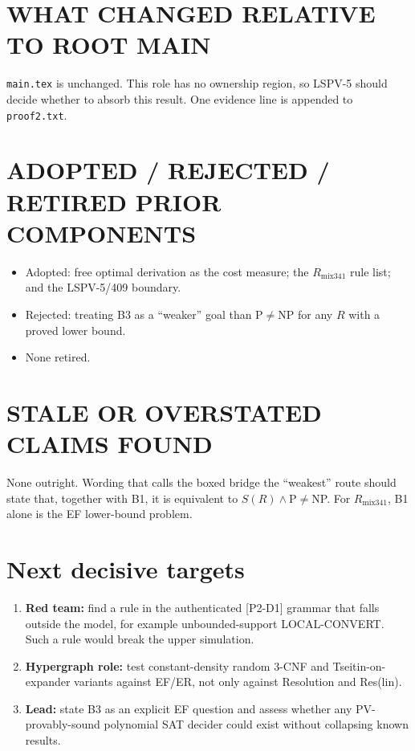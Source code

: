 \documentclass[11pt]{article}
\theoremstyle{remark}
\begin{document}
\section*{WHAT CHANGED RELATIVE TO ROOT MAIN}
\texttt{main.tex} is unchanged. This role has no ownership region, so LSPV-5 should decide whether to absorb this result. One evidence line is appended to \texttt{proof2.txt}.

\section*{ADOPTED / REJECTED / RETIRED PRIOR COMPONENTS}
\begin{itemize}
\item Adopted: free optimal derivation as the cost measure; the $R_{\mathrm{mix341}}$ rule list; and the LSPV-5/409 boundary.
\item Rejected: treating B3 as a ``weaker'' goal than P$\neq$NP for any $R$ with a proved lower bound.
\item None retired.
\end{itemize}

\section*{STALE OR OVERSTATED CLAIMS FOUND}
None outright. Wording that calls the boxed bridge the ``weakest'' route should state that, together with B1, it is equivalent to $S(R)\wedge$P$\neq$NP. For $R_{\mathrm{mix341}}$, B1 alone is the EF lower-bound problem.

\section*{Next decisive targets}
\begin{enumerate}
\item \textbf{Red team:} find a rule in the authenticated [P2-D1] grammar that falls outside the model, for example unbounded-support LOCAL-CONVERT. Such a rule would break the upper simulation.
\item \textbf{Hypergraph role:} test constant-density random 3-CNF and Tseitin-on-expander variants against EF/ER, not only against Resolution and Res(lin).
\item \textbf{Lead:} state B3 as an explicit EF question and assess whether any PV-provably-sound polynomial SAT decider could exist without collapsing known results.
\end{enumerate}
\end{document}
